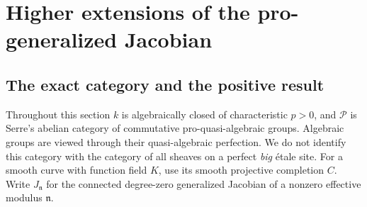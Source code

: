 \section{Higher extensions of the pro-generalized Jacobian}\label{sec:H}
\subsection{The exact category and the positive result}
Throughout this section $k$ is algebraically closed of characteristic $p>0$,
and $\mathcal P$ is Serre's abelian category of commutative
pro-quasi-algebraic groups. Algebraic groups are viewed through their
quasi-algebraic perfection. We do not identify this category with the
category of all sheaves on a perfect \emph{big} \'etale site.
For a smooth curve with function field $K$, use its smooth projective
completion $C$. Write $J_{\mathfrak n}$ for the connected degree-zero
generalized Jacobian of a nonzero effective modulus $\mathfrak n$.

